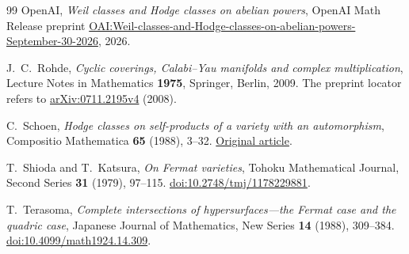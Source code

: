 \documentclass[11pt]{article}
\theoremstyle{plain}
\theoremstyle{definition}
\theoremstyle{remark}
\numberwithin{equation}{section}
\begin{document}
\begin{thebibliography}{99}
OpenAI,
\emph{Weil classes and Hodge classes on abelian powers},
OpenAI Math Release preprint
\href{https://github.com/openai/math/blob/main/preprints/Weil-classes-and-Hodge-classes-on-abelian-powers-September-30-2026/paper.pdf}{OAI:Weil-classes-and-Hodge-classes-on-abelian-powers-September-30-2026},
2026.

J.~C.~Rohde,
\emph{Cyclic coverings, Calabi--Yau manifolds and complex multiplication},
Lecture Notes in Mathematics \textbf{1975}, Springer, Berlin, 2009.
The preprint locator refers to
\href{https://arxiv.org/pdf/0711.2195v4}{arXiv:0711.2195v4} (2008).

C.~Schoen,
\emph{Hodge classes on self-products of a variety with an automorphism},
Compositio Mathematica \textbf{65} (1988), 3--32.
\href{https://www.numdam.org/article/CM_1988__65_1_3_0.pdf}{Original article}.

T.~Shioda and T.~Katsura,
\emph{On Fermat varieties},
Tohoku Mathematical Journal, Second Series \textbf{31} (1979),
97--115.
\href{https://doi.org/10.2748/tmj/1178229881}{doi:10.2748/tmj/1178229881}.

T.~Terasoma,
\emph{Complete intersections of hypersurfaces---the Fermat case
and the quadric case},
Japanese Journal of Mathematics, New Series \textbf{14} (1988),
309--384.
\href{https://doi.org/10.4099/math1924.14.309}{doi:10.4099/math1924.14.309}.

\end{thebibliography}
\end{document}
